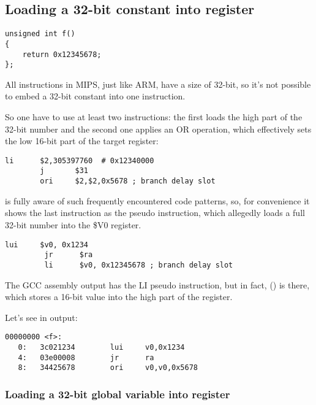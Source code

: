 ﻿\subsection{Loading a 32-bit constant into register}
\label{MIPS_big_constants}

\begin{lstlisting}
unsigned int f()
{
	return 0x12345678;
};
\end{lstlisting}

All instructions in MIPS, just like ARM, have a size of 32-bit, so it's not possible to
embed a 32-bit constant into one instruction.

So one have to use at least two instructions: 
the first loads the high part of the 32-bit number and the second
one applies an OR operation, which effectively sets the low 16-bit part of the target register:

\begin{lstlisting}[caption=GCC 4.4.5 -O3 (\assemblyOutput)]
        li      $2,305397760  # 0x12340000
        j       $31
        ori     $2,$2,0x5678 ; branch delay slot
\end{lstlisting}

\IDA is fully aware of such frequently encountered code patterns, 
so, for convenience it shows the last  instruction as the  pseudo instruction,
which allegedly loads a full 32-bit number into the \$V0 register.


\begin{lstlisting}[caption=GCC 4.4.5 -O3 (IDA)]
         lui     $v0, 0x1234
         jr      $ra
         li      $v0, 0x12345678 ; branch delay slot
\end{lstlisting}

The GCC assembly output has the LI pseudo instruction, but in fact,  () is there,
which stores a 16-bit value into the high part of the register.

Let's see in  output:

\begin{lstlisting}[caption=objdump]
00000000 <f>:
   0:   3c021234        lui     v0,0x1234
   4:   03e00008        jr      ra
   8:   34425678        ori     v0,v0,0x5678
\end{lstlisting}

\subsubsection{Loading a 32-bit global variable into register}

